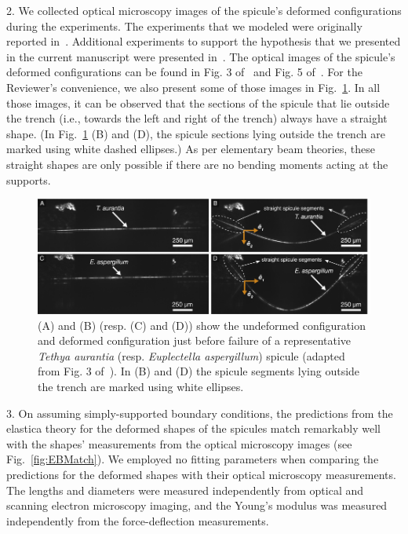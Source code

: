 \documentclass[11pt,letterpaper]{report}
\begin{document}
\begin{enumerate}[label=\textit{1.\arabic*},wide, labelwidth=!, labelindent=0pt]
2. We collected optical microscopy images of the spicule's deformed configurations during the experiments. The experiments that we modeled were originally reported in~\citet{monn2017enhanced}. Additional experiments to support the hypothesis that we presented in the current manuscript were presented in~\citet{kochiyama2021sawtooth}. The optical images of the spicule's deformed configurations can be found in  Fig. 3 of~\citet{monn2017enhanced} and Fig. 5 of~\citet{kochiyama2021sawtooth}. For the Reviewer's convenience, we also present some of those images in Fig.~\ref{fig:photos}. In all those images, it can be observed that the
sections of the spicule that lie outside the trench (i.e., towards the left and right  of the trench) always have a straight shape. (In Fig.~\ref{fig:photos} (B) and (D), the spicule sections lying outside the trench are marked using  white dashed ellipses.) As per elementary beam theories, these straight shapes are only possible if there are no bending moments acting at the supports.




\begin{figure}[H]
\centering
\includegraphics[width = 1.0\textwidth]{Figures/Straight.pdf}
\caption{(A) and (B) (resp. (C) and (D)) show the undeformed configuration and deformed configuration just before failure of a representative \textit{Tethya aurantia} (resp. \textit{Euplectella aspergillum}) spicule (adapted from Fig. 3 of~\citet{monn2017enhanced}). In (B) and (D) the spicule segments lying outside the trench  are marked using white ellipses.}
\label{fig:photos}
\end{figure}


3. On assuming simply-supported boundary conditions, the predictions from the  elastica  theory for the deformed shapes of the spicules match remarkably well with the shapes' measurements  from the optical microscopy images (see Fig.~\ref{fig:EBMatch}).  We employed no  fitting parameters when comparing the predictions for the deformed shapes with their optical microscopy measurements. The lengths and diameters were measured independently from optical and scanning electron microscopy imaging, and the Young's modulus was measured independently from the force-deflection measurements.


\end{enumerate}
\end{document}
